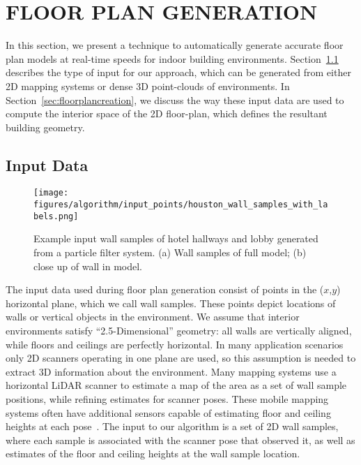 \documentclass[a4paper,twoside]{article}
\begin{document}
\section{\uppercase{Floor Plan Generation}}
\label{sec:approach}

\noindent In this section, we present a technique to automatically generate accurate floor plan models at real-time speeds for indoor building environments.  Section~\ref{sec:inputdata} describes the type of input for our approach, which can be generated from either 2D mapping systems or dense 3D point-clouds of environments.  In Section~\ref{sec:floorplancreation}, we discuss the way these input data are used to compute the interior space of the 2D floor-plan, which defines the resultant building geometry.

\subsection{Input Data}
\label{sec:inputdata}

\begin{figure}[t]
  \centering
  \texttt{[image: figures/algorithm/input\_points/houston\_wall\_samples\_with\_labels.png]}
  \caption{Example input wall samples of hotel hallways and lobby generated from a particle filter system. (a) Wall samples of full model; (b) close up of wall in model.}
  \label{fig:inputdata}
\end{figure}

The input data used during floor plan generation consist of points in the ($x$,$y$) horizontal plane, which we call wall samples.  These points depict locations of walls or vertical objects in the environment.  We assume that interior environments satisfy ``2.5-Dimensional'' geometry:  all walls are vertically aligned, while floors and ceilings are perfectly horizontal.  In many application scenarios only 2D scanners operating in one plane are used, so this assumption is needed to extract 3D information about the environment.  Many mapping systems use a horizontal LiDAR scanner to estimate a map of the area as a set of wall sample positions, while refining estimates for scanner poses.  These mobile mapping systems often have additional sensors capable of estimating floor and ceiling heights at each pose~\cite{Backpack,Quadrotor}.  The input to our algorithm is a set of 2D wall samples, where each sample is associated with the scanner pose that observed it, as well as estimates of the floor and ceiling heights at the wall sample location.
\end{document}

